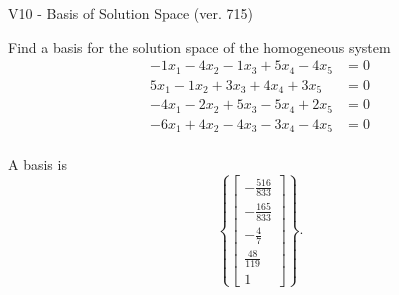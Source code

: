 \begin{exercise}
  \begin{exerciseTitle}V10 - Basis of Solution Space (ver. 715)\end{exerciseTitle}
  \begin{exerciseStatement}
    Find a basis for the solution space of the homogeneous system 
\begin{align*}
 -1 x_ 1 -4 x_ 2 -1 x_ 3 + 5 x_ 4 -4 x_ 5 &= 0  \\ 
  5 x_ 1 -1 x_ 2 + 3 x_ 3 + 4 x_ 4 + 3 x_ 5 &= 0  \\ 
  -4 x_ 1 -2 x_ 2 + 5 x_ 3 -5 x_ 4 + 2 x_ 5 &= 0  \\ 
  -6 x_ 1 + 4 x_ 2 -4 x_ 3 -3 x_ 4 -4 x_ 5 &= 0  \\ 
 \end{align*}


 
  \end{exerciseStatement}

  \begin{exerciseAnswer}
   A basis is   
\[\left\{\left[\begin{array}{c}
-\frac{516}{833} \\
-\frac{165}{833} \\
-\frac{4}{7} \\
\frac{48}{119} \\
1
\end{array}\right]\right\}.\]

  


  \end{exerciseAnswer}
\end{exercise}